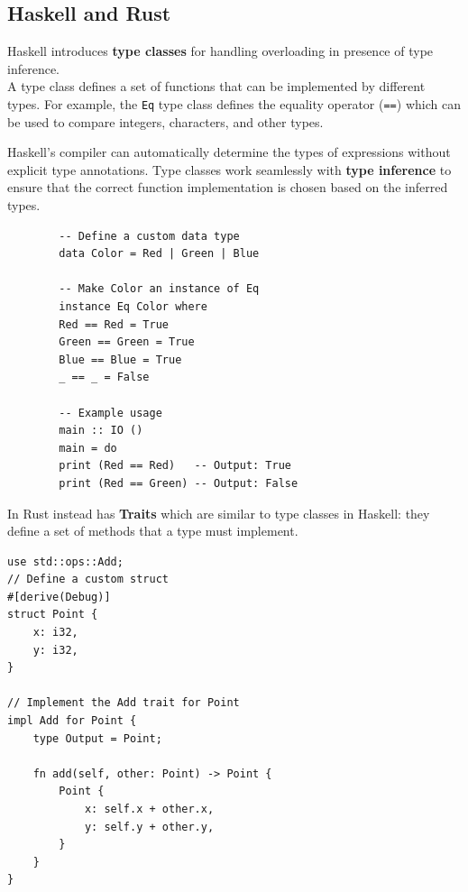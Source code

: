 \subsection{Haskell and Rust}
\lstset{language=Haskell, basicstyle=\footnotesize\ttfamily}
\begin{paracol}{2}

    Haskell introduces \textbf{type classes} for handling
    overloading in presence of type inference.\\
    A type class defines a set of functions that can be implemented by different types. For example, the \lstinline|Eq| type class defines the equality operator (\lstinline|==|) which can be used to compare integers, characters, and other types.
    
    Haskell's compiler can automatically determine the types of expressions without explicit type annotations. Type classes work seamlessly with \textbf{type inference} to ensure that the correct function implementation is chosen based on the inferred types.
    \switchcolumn
    
    
    \begin{lstlisting}
        -- Define a custom data type
        data Color = Red | Green | Blue
        
        -- Make Color an instance of Eq
        instance Eq Color where
        Red == Red = True
        Green == Green = True
        Blue == Blue = True
        _ == _ = False
        
        -- Example usage
        main :: IO ()
        main = do
        print (Red == Red)   -- Output: True
        print (Red == Green) -- Output: False
    \end{lstlisting}
\end{paracol}
    

\lstset{language=Rust}
In Rust instead has \textbf{Traits} which are similar to type classes in Haskell: they define a set of methods that a type must implement.

\begin{lstlisting}
use std::ops::Add;
// Define a custom struct
#[derive(Debug)]
struct Point {
    x: i32,
    y: i32,
}

// Implement the Add trait for Point
impl Add for Point {
    type Output = Point;

    fn add(self, other: Point) -> Point {
        Point {
            x: self.x + other.x,
            y: self.y + other.y,
        }
    }
}
\end{lstlisting}


